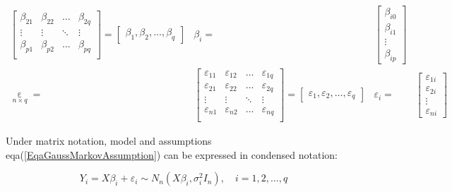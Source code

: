 \begin{subequations}
\begin{align}
\begin{bmatrix}
        \beta _{21}&\beta _{22}&\ldots&\beta _{2q}\\
        \vdots&\vdots&\ddots&\vdots\\
        \beta _{p1}&\beta _{p2}&\ldots&\beta _{pq}\\
        \end{bmatrix} =\begin{bmatrix}
            \beta _1,\beta _2,\ldots,\beta _q
        \end{bmatrix}
        & \beta _i=&\begin{bmatrix}
            \beta _{i0}\\
            \beta_{i1}\\
            \vdots\\
            \beta_{ip}
        \end{bmatrix}\\
        \mathop{\varepsilon }\limits_{n\times q} =&
        \begin{bmatrix}
        \varepsilon _{11}&\varepsilon _{12}&\ldots&\varepsilon _{1q}\\
        \varepsilon _{21}&\varepsilon _{22}&\ldots&\varepsilon _{2q}\\
        \vdots&\vdots&\ddots&\vdots\\
        \varepsilon _{n1}&\varepsilon _{n2}&\ldots&\varepsilon _{nq}\\
        \end{bmatrix}=
        \begin{bmatrix}
            \varepsilon _1,\varepsilon _2,\ldots,\varepsilon _q
        \end{bmatrix}
        &
        \varepsilon _i=&\begin{bmatrix}
                \varepsilon _{1i}\\
                \varepsilon _{2i}\\
                \vdots\\
                \varepsilon _{ni}
            \end{bmatrix}
    \end{align}

    
\end{subequations}


    Under matrix notation, model and assumptions eqa(\ref{EqaGaussMarkovAssumption}) can be expressed in condensed notation:

    \begin{equation}
        Y_i=X\beta_i +\varepsilon_i  \sim N_n(X\beta_i ,\sigma_i^2I_n),\quad i=1,2,\ldots,q
    \end{equation}

